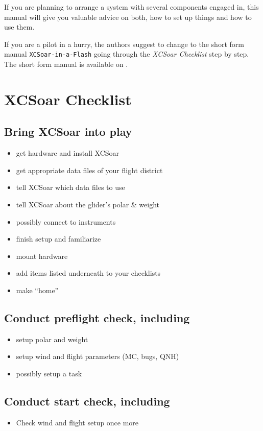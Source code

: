 If you are planning to arrange a system with several components engaged in, 
this manual will give you valuable advice on both, how to set up things and how 
to use them.

If you are a pilot in a hurry, the authors suggest to change to the short form 
manual \texttt{XCSoar-in-a-Flash} going through the \emph{XCSoar Checklist} 
step by step. The short form manual is available on .



\section{XCSoar Checklist}

\subsection*{{Bring XCSoar into play}}
\begin{itemize}
\item get hardware and install XCSoar
\item get appropriate data files of your flight district
\item tell XCSoar which data files to use
\item tell XCSoar about the glider's polar \& weight
\item possibly connect to instruments
\item finish setup and familiarize
\item mount hardware
\item add items listed underneath to your checklists
\item make ``home''
\end{itemize}

\subsection*{Conduct preflight check, including}
\begin{itemize}
\item setup polar and weight
\item setup wind and flight parameters (MC, bugs, QNH)
\item possibly setup a task
\end{itemize}

\subsection*{Conduct start check, including}
\begin{itemize}
\item Check wind and flight setup once more
\end{itemize}
\vspace{2em}

